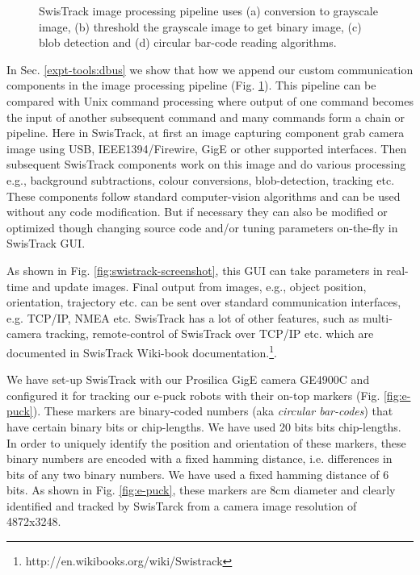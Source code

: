 \begin{figure}
\centering
{} 
\hspace{0.25cm}
\vspace{1cm}
\hspace{0.25cm}
\caption{SwisTrack image processing pipeline uses (a)  conversion to grayscale image, (b) threshold the grayscale image to get binary image, (c) blob detection and (d) circular bar-code reading algorithms.}
\label{fig:swistrack-pipeline}
\end{figure}
In Sec. \ref{expt-tools:dbus} we show that how we append our custom communication components in the image processing pipeline (Fig. \ref{fig:swistrack-pipeline}). This pipeline can be compared with Unix command processing where output of one command becomes the input of another subsequent command and many commands form a chain or pipeline. Here in SwisTrack, at first an image capturing component grab camera image using USB, IEEE1394/Firewire, GigE or other supported interfaces. Then subsequent SwisTrack components work on this image and do various processing e.g., background subtractions, colour conversions, blob-detection, tracking etc. These components follow standard computer-vision algorithms and can be used without any code modification. But if necessary they can also be modified or optimized though changing source code and/or tuning parameters on-the-fly in SwisTrack GUI.

As shown in Fig. \ref{fig:swistrack-screenshot}, this GUI can take parameters in real-time and update images. Final output from images, e.g., object position, orientation, trajectory etc. can be sent over standard communication interfaces, e.g. TCP/IP, NMEA etc. SwisTrack has a lot of other features, such as multi-camera tracking, remote-control of SwisTrack over TCP/IP etc. which are documented in SwisTrack Wiki-book documentation.\footnote{http://en.wikibooks.org/wiki/Swistrack}.

We have set-up SwisTrack with our Prosilica GigE camera GE4900C and configured it for tracking our e-puck robots with their on-top markers (Fig. \ref{fig:e-puck}). These markers are binary-coded numbers (aka {\em circular bar-codes}) that have certain binary bits or chip-lengths. We have used 20 bits bits chip-lengths. In order to uniquely identify the position and orientation of these markers, these binary numbers are encoded with a fixed hamming distance, i.e. differences in bits of any two binary numbers. We have used a fixed hamming distance of 6 bits. As shown in Fig. \ref{fig:e-puck}, these markers are 8cm diameter and clearly identified and tracked by SwisTarck from a camera image resolution of 4872x3248. 

